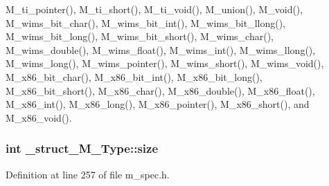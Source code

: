 M\_\-ti\_\-pointer(), M\_\-ti\_\-short(), M\_\-ti\_\-void(), M\_\-union(), M\_\-void(), M\_\-wims\_\-bit\_\-char(), M\_\-wims\_\-bit\_\-int(), M\_\-wims\_\-bit\_\-llong(), M\_\-wims\_\-bit\_\-long(), M\_\-wims\_\-bit\_\-short(), M\_\-wims\_\-char(), M\_\-wims\_\-double(), M\_\-wims\_\-float(), M\_\-wims\_\-int(), M\_\-wims\_\-llong(), M\_\-wims\_\-long(), M\_\-wims\_\-pointer(), M\_\-wims\_\-short(), M\_\-wims\_\-void(), M\_\-x86\_\-bit\_\-char(), M\_\-x86\_\-bit\_\-int(), M\_\-x86\_\-bit\_\-long(), M\_\-x86\_\-bit\_\-short(), M\_\-x86\_\-char(), M\_\-x86\_\-double(), M\_\-x86\_\-float(), M\_\-x86\_\-int(), M\_\-x86\_\-long(), M\_\-x86\_\-pointer(), M\_\-x86\_\-short(), and M\_\-x86\_\-void().
\subsubsection{\setlength{\rightskip}{0pt plus 5cm}int \bf{\_\-struct\_\-M\_\-Type::size}}\label{struct__struct__M__Type_f3a0359fae1e00157dbc804556c90807}




Definition at line 257 of file m\_\-spec.h.

